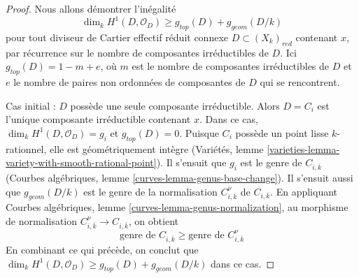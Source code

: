 \begin{proof}
Nous allons démontrer l'inégalité
$$
\dim_k H^1(D, \mathcal{O}_D) \geq g_{top}(D) + g_{geom}(D/k)
$$
pour tout diviseur de Cartier effectif réduit connexe
$D \subset (X_k)_{red}$ contenant $x$, par récurrence sur le nombre de
composantes irréductibles de $D$.
Ici $g_{top}(D) = 1 - m + e$, où $m$ est le nombre de composantes
irréductibles de $D$ et $e$ le nombre de paires non ordonnées de composantes
de $D$ qui se rencontrent.

\medskip\noindent
Cas initial : $D$ possède une seule composante irréductible. Alors
$D = C_i$ est l'unique composante irréductible contenant $x$.
Dans ce cas, $\dim_k H^1(D, \mathcal{O}_D) = g_i$ et
$g_{top}(D) = 0$. Puisque $C_i$ possède un point lisse $k$-rationnel,
elle est géométriquement intègre (Variétés, lemme
\ref{varieties-lemma-variety-with-smooth-rational-point}). Il s'ensuit que
$g_i$ est le genre de $C_{i, \overline{k}}$ (Courbes algébriques, lemme
\ref{curves-lemma-genus-base-change}). Il s'ensuit aussi que
$g_{geom}(D/k)$ est le genre de la normalisation
$C_{i, \overline{k}}^\nu$ de $C_{i, \overline{k}}$. En appliquant Courbes
algébriques, lemme \ref{curves-lemma-genus-normalization}, au morphisme de
normalisation $C_{i, \overline{k}}^\nu \to C_{i, \overline{k}}$, on obtient
\begin{equation}
\label{equation-genus-change-special-component}
\text{genre de }C_{i, \overline{k}} \geq
\text{genre de }C_{i, \overline{k}}^\nu
\end{equation}
En combinant ce qui précède, on conclut que
$\dim_k H^1(D, \mathcal{O}_D) \geq g_{top}(D) + g_{geom}(D/k)$
dans ce cas.


\end{proof}
